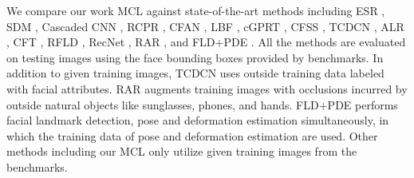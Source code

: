 \documentclass[journal]{IEEEtran}
\begin{document}
We compare our work MCL against state-of-the-art methods including ESR \cite{cao2012face}, SDM \cite{xiong2013supervised}, Cascaded CNN \cite{sun2013deep}, RCPR \cite{burgos2013robust}, CFAN \cite{zhang2014coarse}, LBF \cite{ren2014face}, cGPRT \cite{lee2015face}, CFSS \cite{zhu2015face}, TCDCN \cite{zhang2014facial,zhang2015learning}, ALR \cite{shao2016face}, CFT \cite{shao2016learning}, RFLD \cite{wu2015robust}, RecNet \cite{honari2016recombinator}, RAR \cite{xiao2016robust}, and FLD+PDE \cite{wu2017simultaneous}. All the methods are evaluated on testing images using the face bounding boxes provided by benchmarks. In addition to given training images, TCDCN uses outside training data labeled with facial attributes. RAR augments training images with occlusions incurred by outside natural objects like sunglasses, phones, and hands. FLD+PDE performs facial landmark detection, pose and deformation estimation simultaneously, in which the training data of pose and deformation estimation are used. Other methods including our MCL only utilize given training images from the benchmarks.
\end{document}
